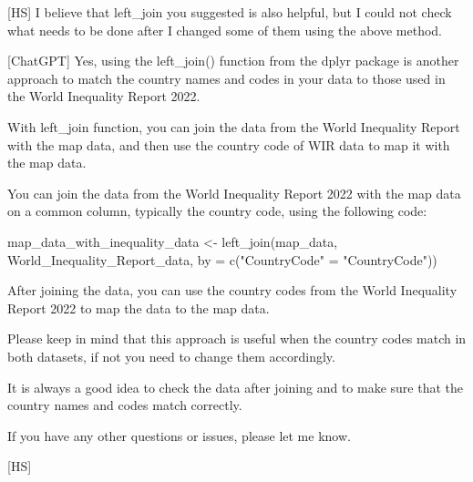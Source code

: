 \documentclass[
]{bxjsbook}
\newenvironment{Shaded}{\begin{snugshade}}{\end{snugshade}}
\newcommand{\AttributeTok}[1]{\textcolor[rgb]{0.77,0.63,0.00}{#1}}
\newcommand{\FunctionTok}[1]{\textcolor[rgb]{0.00,0.00,0.00}{#1}}
\newcommand{\NormalTok}[1]{#1}
\newcommand{\OtherTok}[1]{\textcolor[rgb]{0.56,0.35,0.01}{#1}}
\newcommand{\StringTok}[1]{\textcolor[rgb]{0.31,0.60,0.02}{#1}}
\theoremstyle{definition}
\theoremstyle{definition}
\theoremstyle{definition}
\theoremstyle{definition}
\theoremstyle{remark}
\begin{document}
{[}HS{]} I believe that left\_join you suggested is also helpful, but I could not check what needs to be done after I changed some of them using the above method.

{[}ChatGPT{]} Yes, using the left\_join() function from the dplyr package is another approach to match the country names and codes in your data to those used in the World Inequality Report 2022.

With left\_join function, you can join the data from the World Inequality Report with the map data, and then use the country code of WIR data to map it with the map data.

You can join the data from the World Inequality Report 2022 with the map data on a common column, typically the country code, using the following code:

\begin{Shaded}
\begin{Highlighting}[]
\NormalTok{map\_data\_with\_inequality\_data }\OtherTok{\textless{}{-}} \FunctionTok{left\_join}\NormalTok{(map\_data, World\_Inequality\_Report\_data, }\AttributeTok{by =} \FunctionTok{c}\NormalTok{(}\StringTok{"CountryCode"} \OtherTok{=} \StringTok{"CountryCode"}\NormalTok{))}
\end{Highlighting}
\end{Shaded}

After joining the data, you can use the country codes from the World Inequality Report 2022 to map the data to the map data.

Please keep in mind that this approach is useful when the country codes match in both datasets, if not you need to change them accordingly.

It is always a good idea to check the data after joining and to make sure that the country names and codes match correctly.

If you have any other questions or issues, please let me know.

{[}HS{]}
\end{document}
